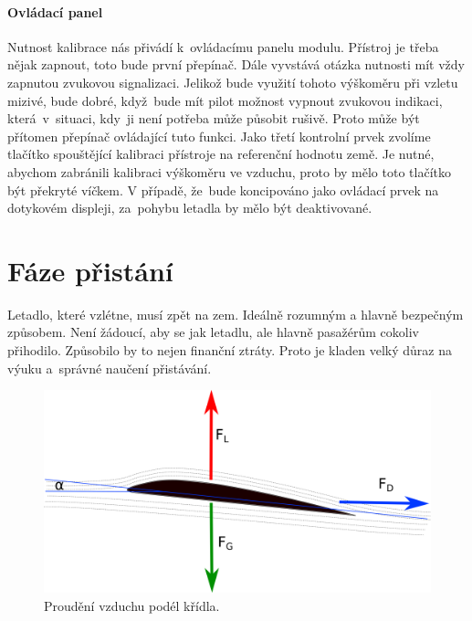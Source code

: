 			\paragraph{Ovládací panel}
				Nutnost kalibrace nás přivádí k~ovládacímu panelu modulu. Přístroj je třeba nějak zapnout, toto bude první přepínač. Dále vyvstává otázka nutnosti mít vždy zapnutou zvukovou signalizaci. Jelikož bude využití tohoto výškoměru při vzletu mizivé, bude dobré, když~bude mít pilot možnost vypnout zvukovou indikaci, která~v~situaci, kdy~ji není potřeba může působit rušivě. Proto může být přítomen přepínač ovládající tuto funkci. Jako třetí kontrolní prvek zvolíme tlačítko spouštějící kalibraci přístroje na referenční hodnotu země. Je nutné, abychom zabránili kalibraci výškoměru ve vzduchu, proto by mělo toto tlačítko být překryté víčkem. V případě, že~bude koncipováno jako ovládací prvek na dotykovém displeji, za~pohybu letadla by mělo být deaktivované.
				
	\section{Fáze přistání}
		Letadlo, které vzlétne, musí zpět na zem. Ideálně rozumným a hlavně bezpečným způsobem. Není žádoucí, aby se jak letadlu, ale hlavně pasažérům cokoliv přihodilo. Způsobilo by to nejen finanční ztráty. Proto je kladen velký důraz na výuku a~správné naučení přistávání.  

		\begin{figure}[H]
			\begin{center}
				\includegraphics[scale=0.7]{obrazky-figures/angle_of_attack.png}
				\caption{Proudění vzduchu podél křídla.}
				\label{teorie::pristani::angle_of_attack}
			\end{center}
		\end{figure}
		
